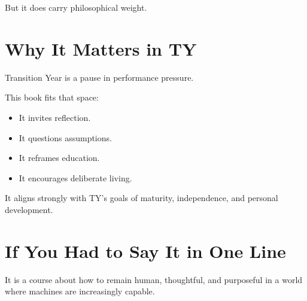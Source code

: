 \documentclass[12pt]{article}
\begin{document}
But it does carry philosophical weight.

\section*{Why It Matters in TY}

Transition Year is a pause in performance pressure.

This book fits that space:
\begin{itemize}
  \item It invites reflection.
  \item It questions assumptions.
  \item It reframes education.
  \item It encourages deliberate living.
\end{itemize}

It aligns strongly with TY’s goals of maturity, independence, and personal development.

\section*{If You Had to Say It in One Line}

\begin{tcolorbox}[
  colback=white,
  colframe=green!40!black,
  opacityframe=0.5,
  fonttitle=\bfseries\color{black},
  title={\mdseries\emoji{light-bulb}\bfseries Tip},
  drop shadow
]
It is a course about how to remain human, thoughtful, and purposeful in a world where machines are increasingly capable.
\end{tcolorbox}
\end{document}
